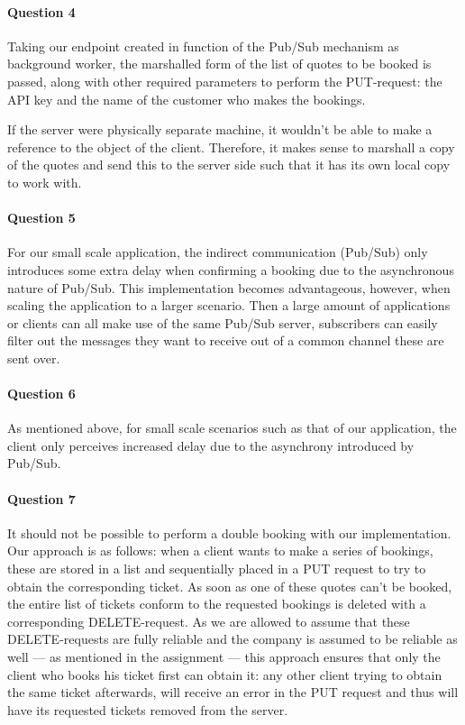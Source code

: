 \documentclass{ds-report}
\begin{document}
 	\paragraph{Question 4}
 	Taking our endpoint created in function of the Pub/Sub mechanism as background worker, the marshalled form of the list of quotes to be booked is passed, along with other required parameters to perform the PUT-request: the API key and the name of the customer who makes the bookings. 
 	
 	If the server were physically separate machine, it wouldn't be able to make a reference to the object of the client. Therefore, it makes sense to marshall a copy of the quotes and send this to the server side such that it has its own local copy to work with.
	
	\paragraph{Question 5}
	For our small scale application, the indirect communication (Pub/Sub) only introduces some extra delay when confirming a booking due to the asynchronous nature of Pub/Sub. This implementation becomes advantageous, however, when scaling the application to a larger scenario. Then a large amount of applications or clients can all make use of the same Pub/Sub server, subscribers can easily filter out the messages they want to receive out of a common channel these are sent over.
	
	\paragraph{Question 6}
	As mentioned above, for small scale scenarios such as that of our application, the client only perceives increased delay due to the asynchrony introduced by Pub/Sub.
	
	\paragraph{Question 7}
	It should not be possible to perform a double booking with our implementation. Our approach is as follows: when a client wants to make a series of bookings, these are stored in a list and sequentially placed in a PUT request to try to obtain the corresponding ticket. As soon as one of these quotes can't be booked, the entire list of tickets conform to the requested bookings is deleted with a corresponding DELETE-request. As we are allowed to assume that these DELETE-requests are fully reliable and the company is assumed to be reliable as well --- as mentioned in the assignment --- this approach ensures that only the client who books his ticket first can obtain it: any other client trying to obtain the same ticket afterwards, will receive an error in the PUT request and thus will have its requested tickets removed from the server.
	
\end{document}
